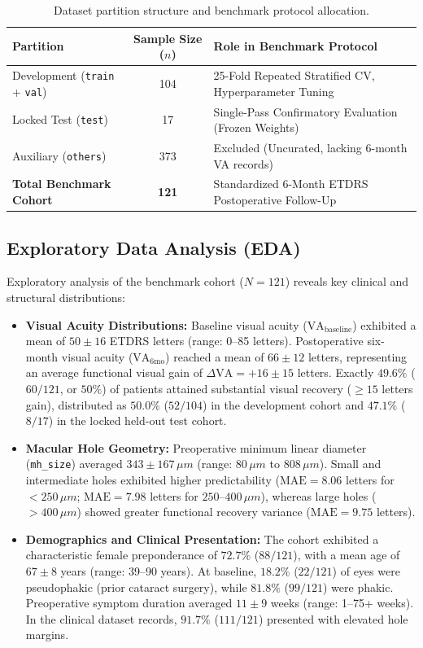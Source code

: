 \documentclass[preprint,12pt]{elsarticle}
\begin{document}
\begin{table}[t]
\centering
\caption{Dataset partition structure and benchmark protocol allocation.}
\label{tab:dataset_partitions}
\renewcommand{\arraystretch}{1.1}
\footnotesize
\begin{tabular}{lcl}
\toprule
\textbf{Partition} & \textbf{Sample Size ($n$)} & \textbf{Role in Benchmark Protocol} \\
\midrule
Development (\texttt{train} + \texttt{val}) & 104 & 25-Fold Repeated Stratified CV, Hyperparameter Tuning \\
Locked Test (\texttt{test}) & 17 & Single-Pass Confirmatory Evaluation (Frozen Weights) \\
Auxiliary (\texttt{others}) & 373 & Excluded (Uncurated, lacking 6-month VA records) \\
\midrule
\textbf{Total Benchmark Cohort} & \textbf{121} & Standardized 6-Month ETDRS Postoperative Follow-Up \\
\bottomrule
\end{tabular}
\end{table}

\subsection{Exploratory Data Analysis (EDA)}
\label{sec:eda}
Exploratory analysis of the benchmark cohort ($N=121$) reveals key clinical and structural distributions:
\begin{itemize}
    \item \textbf{Visual Acuity Distributions:} Baseline visual acuity ($\text{VA}_{\text{baseline}}$) exhibited a mean of $50 \pm 16$ ETDRS letters (range: 0--85 letters). Postoperative six-month visual acuity ($\text{VA}_{6\text{mo}}$) reached a mean of $66 \pm 12$ letters, representing an average functional visual gain of $\Delta \text{VA} = +16 \pm 15$ letters. Exactly $49.6\%$ ($60/121$, or $50\%$) of patients attained substantial visual recovery ($\ge 15$ letters gain), distributed as $50.0\%$ ($52/104$) in the development cohort and $47.1\%$ ($8/17$) in the locked held-out test cohort.
    \item \textbf{Macular Hole Geometry:} Preoperative minimum linear diameter (\texttt{mh\_size}) averaged $343 \pm 167\,\mu m$ (range: $80\,\mu m$ to $808\,\mu m$). Small and intermediate holes exhibited higher predictability ($\text{MAE} = 8.06$ letters for $<250\,\mu m$; $\text{MAE} = 7.98$ letters for $250\text{--}400\,\mu m$), whereas large holes ($>400\,\mu m$) showed greater functional recovery variance ($\text{MAE} = 9.75$ letters).
    \item \textbf{Demographics and Clinical Presentation:} The cohort exhibited a characteristic female preponderance of $72.7\%$ ($88/121$), with a mean age of $67 \pm 8$ years (range: 39--90 years). At baseline, $18.2\%$ ($22/121$) of eyes were pseudophakic (prior cataract surgery), while $81.8\%$ ($99/121$) were phakic. Preoperative symptom duration averaged $11 \pm 9$ weeks (range: 1--75+ weeks). In the clinical dataset records, $91.7\%$ ($111/121$) presented with elevated hole margins.
\end{itemize}
\end{document}
